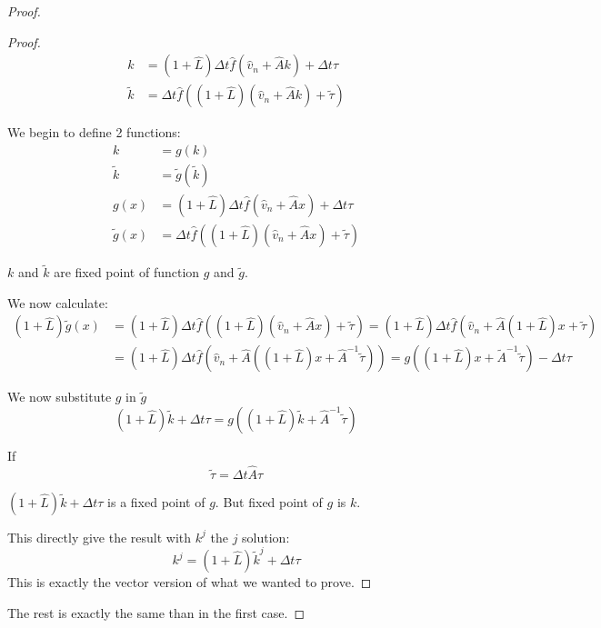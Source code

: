 \begin{proof}
\begin{proof}
\begin{align}
k&=(1+\hat{L})\Delta t\hat{f}(\hat{v}_{n}+\hat{A}k)+\Delta t\tau\\
\tilde{k}&=\Delta t \hat{f}((1+\hat{L})(\hat{v}_{n}+\hat{A}k)+\tilde{\tau})
\end{align}

We begin to define 2 functions:
\begin{align}
k&=g(k)\\
\tilde{k}&=\tilde{g}(\tilde{k})\\
g(x)&=(1+\hat{L})\Delta t \hat{f}(\hat{v}_{n}+\hat{A}x)+\Delta t\tau\\
\tilde{g}(x)&=\Delta t \hat{f}((1+\hat{L})(\hat{v}_{n}+\hat{A}x)+\tilde{\tau})
\end{align}

$k$ and $\tilde{k}$ are fixed point of function $g$ and $\tilde{g}$.

We now calculate:
\begin{align}
(1+\hat{L})\tilde{g}(x)&=(1+\hat{L})\Delta t \hat{f}((1+\hat{L})(\hat{v}_{n}+\hat{A}x)+\tilde{\tau})=(1+\hat{L})\Delta t \hat{f}(\hat{v}_{n}+\hat{A} (1+\hat{L})x+\tilde{\tau})\\
&=(1+\hat{L})\Delta t \hat{f}(\hat{v}_{n}+\hat{A} ((1+\hat{L})x+\hat{A}^{-1}\tilde{\tau}))=g((1+\hat{L})x+\tilde{A}^{-1}\tilde{\tau})-\Delta t \tau
\end{align}

We now substitute $g$ in $\tilde{g}$
\begin{equation}
(1+\hat{L})\tilde{k}+\Delta t \tau=g((1+\hat{L})\tilde{k}+\hat{A}^{-1}\tilde{\tau})
\end{equation}

If
\begin{equation}
  \tilde{\tau}=\Delta t \hat{A}\tau
\end{equation}

$(1+\hat{L})\tilde{k}+\Delta t \tau$ is a fixed point of $g$.
But fixed point of $g$ is $k$.

This directly give the result with $k^{j}$ the $j$ solution:
\begin{equation}
k^{j}=(1+\hat{L})\tilde{k}^{j}+\Delta t \tau
\end{equation}
This is exactly the vector version of what we wanted to prove.
\end{proof}

The rest is exactly the same than in the first case.


\end{proof}
